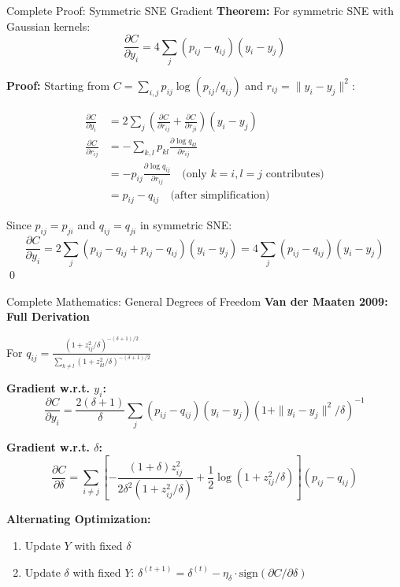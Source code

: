 \begin{frame}{Complete Proof: Symmetric SNE Gradient}
\small
\textbf{Theorem:} For symmetric SNE with Gaussian kernels:
$$\frac{\partial C}{\partial y_i} = 4\sum_j (p_{ij} - q_{ij})(y_i - y_j)$$

\textbf{Proof:}
Starting from $C = \sum_{i,j} p_{ij} \log(p_{ij}/q_{ij})$ and $r_{ij} = \|y_i - y_j\|^2$:

\begin{align*}
\frac{\partial C}{\partial y_i} &= 2\sum_j \left(\frac{\partial C}{\partial r_{ij}} + \frac{\partial C}{\partial r_{ji}}\right)(y_i - y_j)\\
\frac{\partial C}{\partial r_{ij}} &= -\sum_{k,l} p_{kl} \frac{\partial \log q_{kl}}{\partial r_{ij}}\\
&= -p_{ij} \frac{\partial \log q_{ij}}{\partial r_{ij}} \quad \text{(only } k=i, l=j \text{ contributes)}\\
&= p_{ij} - q_{ij} \quad \text{(after simplification)}
\end{align*}

Since $p_{ij} = p_{ji}$ and $q_{ij} = q_{ji}$ in symmetric SNE:
$$\frac{\partial C}{\partial y_i} = 2\sum_j (p_{ij} - q_{ij} + p_{ij} - q_{ij})(y_i - y_j) = 4\sum_j (p_{ij} - q_{ij})(y_i - y_j)$$ \qed
\end{frame}

\begin{frame}{Complete Mathematics: General Degrees of Freedom}
\textbf{Van der Maaten 2009: Full Derivation}

For $q_{ij} = \frac{(1 + z_{ij}^2/\delta)^{-(\delta+1)/2}}{\sum_{k \neq l}(1 + z_{kl}^2/\delta)^{-(\delta+1)/2}}$

\textbf{Gradient w.r.t. $y_i$:}
$$\frac{\partial C}{\partial y_i} = \frac{2(\delta + 1)}{\delta}\sum_j (p_{ij} - q_{ij})(y_i - y_j)(1 + \|y_i - y_j\|^2/\delta)^{-1}$$

\textbf{Gradient w.r.t. $\delta$:}
\small
$$\frac{\partial C}{\partial \delta} = \sum_{i \neq j} \left[-\frac{(1+\delta)z_{ij}^2}{2\delta^2(1 + z_{ij}^2/\delta)} + \frac{1}{2}\log(1 + z_{ij}^2/\delta)\right](p_{ij} - q_{ij})$$

\textbf{Alternating Optimization:}
\begin{enumerate}
\item Update $Y$ with fixed $\delta$
\item Update $\delta$ with fixed $Y$: $\delta^{(t+1)} = \delta^{(t)} - \eta_\delta \cdot \text{sign}(\partial C/\partial \delta)$
\end{enumerate}
\end{frame}

